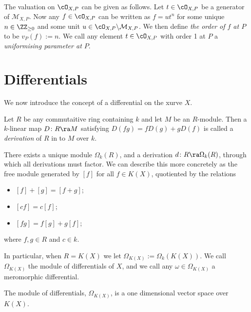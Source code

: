 The valuation on $\cO_{X,P}$ can be given as follows.
Let $t \in \cO_{X,P}$ be a generator of $\mathcal{M}_{X,P}$.
Now any $f \in \cO_{X,P}$ can be written as $f = ut^n$ for some unique $n \in \ZZ_{\geq 0}$ and some unit $u \in \cO_{X,P}\backslash \mathcal{M}_{X,P}$.
We then define \emph{the order of $f$ at $P$} to be $v_P(f) := n$.
We call any element $t \in \cO_{X,P}$ with order 1 at $P$ a \emph{uniformising parameter at $P$}.

\section{Differentials}

We now introduce the concept of a differential on the xurve $X$.

Let $R$ be any commutaitive ring containing $k$ and let $M$ be an $R$-module.
Then a $k$-linear map $D \colon R \ra M$ satisfying $D(fg) = fD(g) + gD(f)$ is called a \emph{derivation} of $R$ in to $M$ over $k$.

There exists a unique module $\Omega_k(R)$, and a derivation $d \colon R \ra \Omega_k(R)$, through which all derivations must factor.
We can describe this more concretely as the free module generated by $[f]$ for all $f \in K(X)$, quotiented by the relations
    \begin{itemize}
    \item $[f]+[g] = [f+g]$;
    \item $[cf] = c[f]$;
    \item $[fg] = f[g] + g[f]$;
    \end{itemize}
where $f, g \in R$ and $c \in k$.

In particular, when $R = K(X)$ we let $\Omega_{K(X)} := \Omega_k(K(X))$.
We call $\Omega_{K(X)}$ the module of differentials of $X$, and we call any $ \omega \in \Omega_{K(X)}$ a meromorphic differential.

    \begin{prop}
    The module of differentials, $\Omega_{K(X)}$, is a one dimensional vector space over $K(X)$.
    \end{prop}







